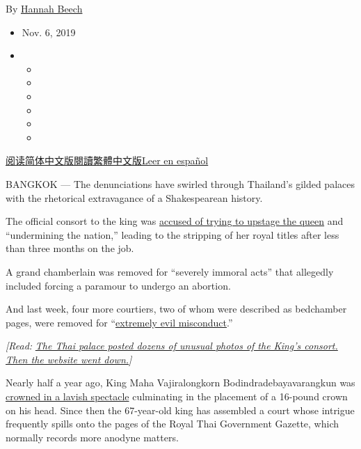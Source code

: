 By \href{https://www.nytimes3xbfgragh.onion/by/hannah-beech}{Hannah
Beech}

\begin{itemize}
\item
  Nov. 6, 2019
\item
  \begin{itemize}
  \item
  \item
  \item
  \item
  \item
  \item
  \end{itemize}
\end{itemize}

\href{https://cn.nytimes3xbfgragh.onion/asia-pacific/20191106/thailand-king-consort-wives/}{阅读简体中文版}\href{https://cn.nytimes3xbfgragh.onion/asia-pacific/20191106/thailand-king-consort-wives/zh-hant/}{閱讀繁體中文版}\href{https://www.nytimes3xbfgragh.onion/es/2019/11/07/espanol/mundo/tailandia-monarquia-escandalos.html}{Leer
en español}

BANGKOK --- The denunciations have swirled through Thailand's gilded
palaces with the rhetorical extravagance of a Shakespearean history.

The official consort to the king was
\href{https://www.nytimes3xbfgragh.onion/2019/10/21/world/asia/king-thailand-royal-consort.html?module=inline}{accused
of trying to upstage the queen} and ``undermining the nation,'' leading
to the stripping of her royal titles after less than three months on the
job.

A grand chamberlain was removed for ``severely immoral acts'' that
allegedly included forcing a paramour to undergo an abortion.

And last week, four more courtiers, two of whom were described as
bedchamber pages, were removed for
``\href{http://www.ratchakitcha.soc.go.th/DATA/PDF/2562/B/057/T_0001.PDF}{extremely
evil misconduct}.''

\emph{{[}Read:}
\href{https://www.nytimes3xbfgragh.onion/2019/08/27/world/asia/thailand-consort-king.html?rref=collection\%2Fbyline\%2Fhannah-beech}{\emph{The
Thai palace posted dozens of unusual photos of the King's consort. Then
the website went down.}}\emph{{]}}

Nearly half a year ago, King Maha Vajiralongkorn Bodindradebayavarangkun
was
\href{https://www.nytimes3xbfgragh.onion/2019/05/04/world/asia/thailand-king-maha-vajiralongkorn.html}{crowned
in a lavish spectacle} culminating in the placement of a 16-pound crown
on his head. Since then the 67-year-old king has assembled a court whose
intrigue frequently spills onto the pages of the Royal Thai Government
Gazette, which normally records more anodyne matters.

